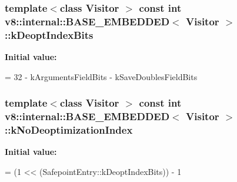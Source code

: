 \subsubsection[{k\+Deopt\+Index\+Bits}]{\setlength{\rightskip}{0pt plus 5cm}template$<$class Visitor $>$ const int {\bf v8\+::internal\+::\+B\+A\+S\+E\+\_\+\+E\+M\+B\+E\+D\+D\+E\+D}$<$ Visitor $>$\+::k\+Deopt\+Index\+Bits\hspace{0.3cm}{\ttfamily [static]}}\label{classv8_1_1internal_1_1_b_a_s_e___e_m_b_e_d_d_e_d_af85a710280f70479850faf4cd23ef57b}
{\bfseries Initial value\+:}
\begin{DoxyCode}
=
      32 - kArgumentsFieldBits - kSaveDoublesFieldBits
\end{DoxyCode}
\hypertarget{classv8_1_1internal_1_1_b_a_s_e___e_m_b_e_d_d_e_d_ac10255be30e7a0d3249a12f3419e2756}{}
\subsubsection[{k\+No\+Deoptimization\+Index}]{\setlength{\rightskip}{0pt plus 5cm}template$<$class Visitor $>$ const int {\bf v8\+::internal\+::\+B\+A\+S\+E\+\_\+\+E\+M\+B\+E\+D\+D\+E\+D}$<$ Visitor $>$\+::k\+No\+Deoptimization\+Index\hspace{0.3cm}{\ttfamily [static]}}\label{classv8_1_1internal_1_1_b_a_s_e___e_m_b_e_d_d_e_d_ac10255be30e7a0d3249a12f3419e2756}
{\bfseries Initial value\+:}
\begin{DoxyCode}
=
      (1 << (SafepointEntry::kDeoptIndexBits)) - 1
\end{DoxyCode}


